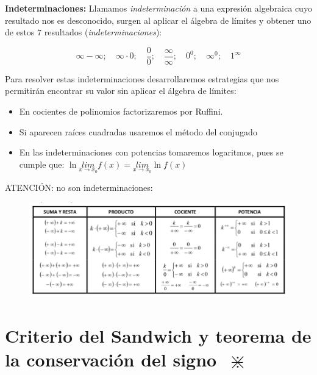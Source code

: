 			\textbf{Indeterminaciones:} Llamamos \emph{indeterminación} a una expresión algebraica cuyo resultado nos es desconocido, surgen al aplicar el álgebra de límites  y obtener uno de estos $7$ resultados (\textit{indeterminaciones}):
				
				\begin{equation}
					\infty - \infty; \quad \infty \cdot 0; \quad \frac 0 0; \quad \frac {\infty}{\infty}; \quad 0^0; \quad \infty ^0; \quad 1^{\infty}
						\label{indeterminaciones}
				\end{equation}
				
				Para resolver estas indeterminaciones desarrollaremos estrategias que nos permitirán encontrar su valor sin aplicar el álgebra de límites:
				 
				\begin{itemize}
					\item En cocientes de polinomios factorizaremos por Ruffini.
					\item Si aparecen raíces cuadradas usaremos el método del conjugado
					\item En las indeterminaciones con potencias tomaremos logaritmos, pues se cumple que: $\ln {\underset {x \to x_0}{ lim}{f(x)} }= \underset {x \to x_0}{lim}{\ln f(x)}$
				\end{itemize}
				
		
		 
		 ATENCIÓN: no son indeterminaciones:
		
		
			\begin{figure}[H]
			\centering
			\includegraphics[width=1
			\textwidth]{imagenes/imagenes03/T03IM06.png}
			\end{figure}
	
	
	
	\section[Criterio del Sandwich y teorema de la conservación del signo $\; \divideontimes$]{Criterio del Sandwich y teorema de la conservación del signo $\; \divideontimes$}
	
